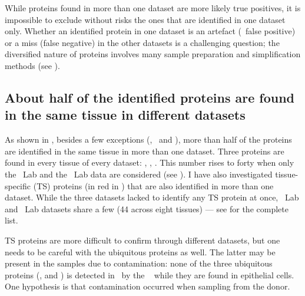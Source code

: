 While proteins found in more than one dataset are more likely true positives,
it is impossible to exclude without risks the ones
that are identified in one dataset only.
Whether an identified protein in one dataset is
an artefact (\ie\ false positive) or a miss (false negative) in the other datasets
is a challenging question;
the diversified nature of proteins involves
many sample preparation and simplification methods
(see ).\mybr\




\subsection{About half of the identified proteins are found in the same tissue
in different datasets}\label{subsec:halfProtConfirmed}

As shown in ,
besides a few exceptions (\oesophagus, \gall\ and \testis),
more than half of the proteins are identified in the same tissue
in more than one dataset.
Three proteins are found in every tissue of every dataset:
,  , .
This number rises to forty when only the \pandey\ Lab and the \kuster\ Lab data
are considered (see ).
I have also investigated tissue-specific (\gls{TS}) proteins
(in red in )
that are also identified in more than one dataset.
While the three datasets lacked to identify any \gls{TS} protein at once,
\pandey\ Lab and \kuster\ Lab datasets share a few (44 across eight tissues)
--- see  for the complete list.\mybr\
\begin{comment}
twelve for \kidney, nine for \placenta, seven for \pancreas,
five for \adrenal\ and \liver, four for \testis,
and one for \prostate\ and \rectum.
\end{comment}

\gls{TS} proteins are more difficult to confirm
through different datasets,
but one needs to be careful with the ubiquitous proteins as well.
The latter may be present in the samples due to contamination:
none of the three ubiquitous proteins
(,   and )
is detected in \heart\ by the
~
while they are found in epithelial cells.
One hypothesis is that contamination occurred when sampling from the donor.\mybr\

